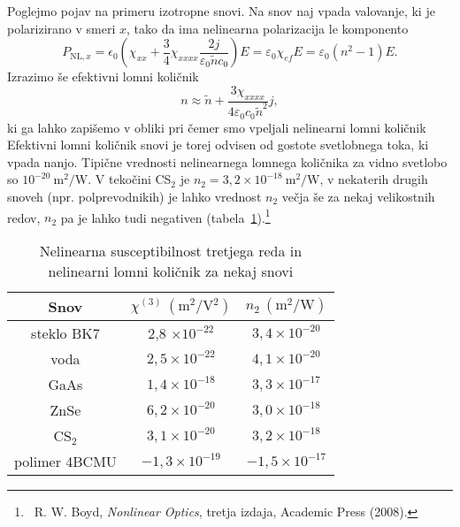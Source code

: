 Poglejmo pojav na primeru izotropne snovi. Na snov naj vpada valovanje, ki je polarizirano
v smeri $x$, tako da ima nelinearna polarizacija le komponento 
\begin{equation}
P_{\mathrm{NL},x}=
\epsilon_{0} \left(\chi_{xx} +\frac{3}{4} \chi_{xxxx}\frac{2 j }
{\varepsilon_0 \tilde{n} c_0}\right)E = \varepsilon_0 \chi_{ef}E = \varepsilon_0 (n^2-1) E.
\end{equation}
Izrazimo še efektivni lomni količnik
\begin{equation}
n \approx \tilde{n} + \frac{3 \chi_{xxxx}}{4 \varepsilon_0 c_0 \tilde{n}^2} j,
\end{equation}
ki ga lahko zapišemo v obliki 
pri čemer smo vpeljali nelinearni lomni količnik
Efektivni lomni količnik snovi je torej odvisen od gostote svetlobnega toka, ki vpada nanjo. 
Tipične vrednosti nelinearnega lomnega količnika za vidno svetlobo so $10^{-20}~\si{\metre^2/\watt}$.
V tekočini CS$_2$ je $n_2 = 3,2 \times 10^{-18}~\si{\metre^2/\watt}$, v nekaterih 
drugih snoveh (npr. polprevodnikih) je lahko vrednost $n_2$ večja še za nekaj 
velikostnih redov, $n_2$ pa je lahko tudi negativen (tabela~\ref{table:chi3}).\footnote{~R.
W. Boyd, {\it Nonlinear Optics}, tretja izdaja, Academic Press (2008).}

\begin{table}[ht]
 \centering
\begin{tabular}{|c|c|c|} \hline  
      Snov & $\chi^{(3)}~(\si{\metre^2/\volt^2})$ & $n_2~(\si{\metre^2/\watt})$\\ \hline
     steklo BK7 & 2,8 $\times 10^{-22}$ & $3,4 \times 10^{-20}$ \\ \hline
     voda & $2,5 \times 10^{-22}$ & $4,1 \times 10^{-20}$ \\ \hline
     GaAs & $1,4 \times 10^{-18}$ & $3,3 \times 10^{-17}$ \\ \hline\index{GaAs}
     ZnSe & $6,2 \times 10^{-20}$ & $3,0 \times 10^{-18}$ \\ \hline\index{ZnSe}
     CS$_2$ & $3,1 \times 10^{-20}$ & $3,2 \times 10^{-18}$ \\ \hline \index{CS$_2$}
     polimer 4BCMU  & $-1,3 \times 10^{-19}$ & $-1,5 \times 10^{-17}$ \\ \hline      
\end{tabular}
  \caption{Nelinearna susceptibilnost tretjega reda in nelinearni lomni količnik za nekaj snovi}
\label{table:chi3}
\end{table}

